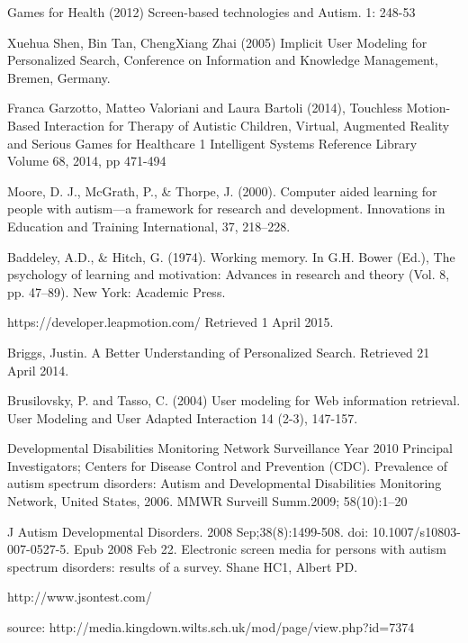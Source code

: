\documentclass[10pt]{article}
\begin{document}
\begin{thebibliography}{100}

 Games for Health (2012) Screen-based technologies and Autism. 1: 248-53

Xuehua Shen, Bin Tan, ChengXiang Zhai (2005) Implicit User Modeling for Personalized Search, Conference on Information and Knowledge Management, Bremen, Germany.

 Franca Garzotto, Matteo Valoriani and Laura Bartoli (2014), Touchless Motion-Based Interaction for Therapy of Autistic Children, Virtual, Augmented Reality and Serious Games for Healthcare 1 Intelligent Systems Reference Library Volume 68, 2014, pp 471-494

Moore, D. J., McGrath, P., \& Thorpe, J. (2000). Computer aided learning for people with autism—a framework for research and development. Innovations in Education and Training International, 37, 218–228.

Baddeley, A.D., \& Hitch, G. (1974). Working memory. In G.H. Bower (Ed.), The psychology of learning and motivation: Advances in research and theory (Vol. 8, pp. 47–89). New York: Academic Press.

 https://developer.leapmotion.com/ Retrieved 1 April 2015.

Briggs, Justin. A Better Understanding of Personalized Search. Retrieved 21 April 2014.

Brusilovsky, P. and Tasso, C. (2004) User modeling for Web information retrieval. User Modeling and User Adapted Interaction 14 (2-3), 147-157.


Developmental Disabilities Monitoring Network Surveillance Year 2010 Principal Investigators; Centers for Disease Control and Prevention (CDC). Prevalence of autism spectrum disorders: Autism and Developmental Disabilities Monitoring Network, United States, 2006. MMWR Surveill Summ.2009; 58(10):1–20


J Autism Developmental Disorders. 2008 Sep;38(8):1499-508. doi: 10.1007/s10803-007-0527-5. Epub 2008 Feb 22. Electronic screen media for persons with autism spectrum disorders: results of a survey.
Shane HC1, Albert PD.

http://www.jsontest.com/

source: http://media.kingdown.wilts.sch.uk/mod/page/view.php?id=7374


\end{thebibliography}
\end{document}
